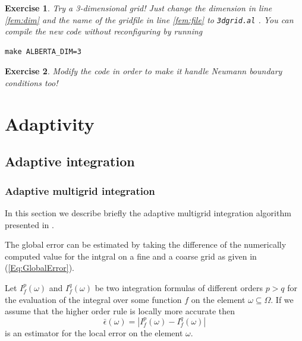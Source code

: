 \documentclass[11pt,a4paper,headinclude,footinclude,DIV16,normalheadings]{scrreprt}
\newtheorem{exc}{Exercise}[chapter]
\begin{document}
\begin{exc}
 Try a 3-dimensional grid! Just change the dimension in line \ref{fem:dim} and the name of the gridfile in line \ref{fem:file} to \lstinline!3dgrid.al! . You can compile the new code without reconfiguring by running
\begin{lstlisting}
make ALBERTA_DIM=3
\end{lstlisting}
\end{exc}

\begin{exc}
 Modify the code in order to make it handle Neumann boundary conditions too!
\end{exc}



\chapter{Adaptivity}

\section{Adaptive integration}

\subsection{Adaptive multigrid integration}

In this section we describe briefly the adaptive multigrid integration
algorithm presented in \cite{Deuflhard93}.


The global error can be estimated by taking the difference of the numerically
computed value for the intgral on a fine and a coarse grid as given in
(\ref{Eq:GlobalError}). 


Let $I_f^p(\omega)$ and $I_f^q(\omega)$ be two integration formulas of
different orders $p>q$ for the evaluation of the integral over some
function $f$ on the element $\omega\subseteq\Omega$. If we assume that
the higher order rule is locally more accurate then 
\begin{equation}
\bar{\epsilon}(\omega) = |I_f^p(\omega)-I_f^q(\omega)|
\end{equation}
is an estimator for the local error on the element $\omega$.

\end{document}

